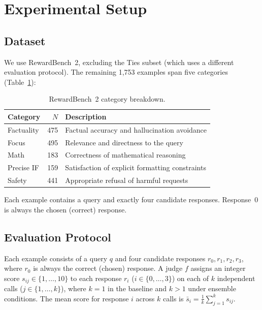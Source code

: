 \documentclass{article}
\begin{document}
\section{Experimental Setup}
\label{sec:setup}

\subsection{Dataset}
\label{sec:dataset}

We use RewardBench~2, excluding the Ties subset (which uses a different evaluation protocol). The remaining 1,753 examples span five categories (Table~\ref{tab:dataset}):

\begin{table}[ht]
\centering
\caption{RewardBench~2 category breakdown.}
\label{tab:dataset}
\begin{tabular}{lrl}
\toprule
Category & $N$ & Description \\
\midrule
Factuality  & 475 & Factual accuracy and hallucination avoidance \\
Focus       & 495 & Relevance and directness to the query \\
Math        & 183 & Correctness of mathematical reasoning \\
Precise IF  & 159 & Satisfaction of explicit formatting constraints \\
Safety      & 441 & Appropriate refusal of harmful requests \\
\bottomrule
\end{tabular}
\end{table}

Each example contains a query and exactly four candidate responses. Response~0 is always the chosen (correct) response.

\subsection{Evaluation Protocol}
\label{sec:protocol}

Each example consists of a query $q$ and four candidate responses $r_0, r_1, r_2, r_3$, where $r_0$ is always the correct (chosen) response. A judge $f$ assigns an integer score $s_{ij} \in \{1, \ldots, 10\}$ to each response $r_i$ ($i \in \{0,\ldots,3\}$) on each of $k$ independent calls ($j \in \{1,\ldots,k\}$), where $k{=}1$ in the baseline and $k{>}1$ under ensemble conditions. The mean score for response $i$ across $k$ calls is $\bar{s}_i = \frac{1}{k}\sum_{j=1}^k s_{ij}$.
\end{document}
